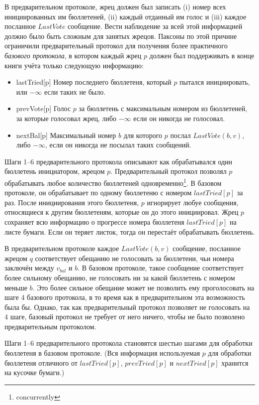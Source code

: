 \documentclass[12pt, a4paper]{article} %
\begin{document}
В предварительном протоколе, жрец должен был записать (i) номер всех инициированных им бюллетеней, (ii) каждый отданный им голос и (iii) каждое посланное $LastVote$ сообщение. Вести наблюдение за всей этой информацией должно было быть сложным для занятых жрецов. Паксоны по этой причине ограничили предварительный протокол для получения более практичного \textit{базового протокола}, в котором каждый жрец $p$ должен был поддерживать в конце книги учёта только следующую информацию:
\begin{itemize}
    \item[]lastTried[p] Номер последнего бюллетеня, который $p$ пытался инициировать, или $-\infty$ если таких не было.
    \item[]prevVote[p] Голос $p$ за бюллетень с максимальным номером из бюллетеней, за которые голосовал жрец, либо $-\infty$ если он никогда не голосовал.
    \item[]nextBal[p] Максимальный номер $b$ для которого $p$ послал $LastVote(b, v)$, либо $-\infty$, если он никогда не посылал таких сообщений.
\end{itemize}

Шаги 1--6 предварительного протокола описывают как обрабатывался один бюллетень инициатором, жрецом $p$. Предварительный протокол позволял $p$ обрабатывать любое количество бюллетеней одновременно\footnote{concurrently}. В базовом протоколе, он обрабатывает по одному бюллетеню с номером $lastTried[p]$ за раз. После инициирования этого бюллетеня, $p$ игнорирует любуе сообщения, относящиеся к другим бюллетеням, которые он до этого инициировал. Жрец $p$ сохраняет всю информацию о прогрессе номера бюллетеня $lastTried[p]$ на листе бумаги. Если он теряет листок, тогда он перестаёт обрабатывать бюллетень.

В предварительном протоколе каждое $LastVote(b, v)$ сообщение, посланное жрецом $q$ соответствует обещанию не голосовать за бюллетени, чьи номера заключён между $v_{bal}$ и $b$. В базовом протоколе, такое сообщение соответствует более сильному обещанию, не голосовать ни за какой бюллетень с номером меньше $b$. Это более сильное обещание может не позволить ему проголосовать на шаге 4 базового протокола, в то время как в предварительном эта возможность была бы. Однако, так как предварительный протокол позволяет не голосовать на 4 шаге, базовый протокол не требует от него ничего, чтобы не было позволено предварительным протоколом.

Шаги 1--6 предварительного протокола становятся шестью шагами для обработки бюллетеня в базовом протоколе. (Вся информация используемая $p$ для обработки бюллетеня отличного от $lastTried[p]$, $prevTried[p]$ и $nextTried[p]$ хранится на кусочке бумаги.)
\end{document}
